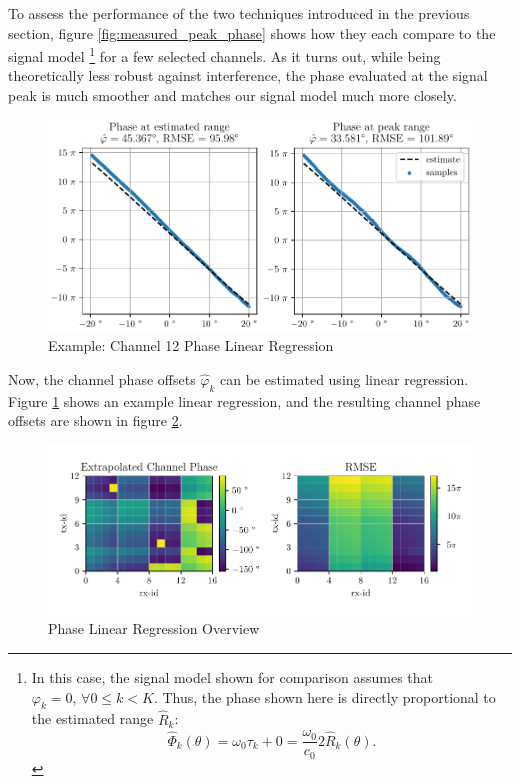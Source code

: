 To assess the performance of the two techniques introduced in the previous section,
figure \ref{fig:measured_peak_phase} shows how they each compare to the signal model
\footnote{
    In this case, the signal model shown for comparison assumes that $\varphi_k = 0,\, \forall 0 \leq k<K$.
    Thus, the phase shown here is directly proportional to the estimated range $\hat R_k$:
    $$
        \hat\Phi_k(\theta) = \omega_0 \tau_k + 0 =  \frac{\omega_0}{c_0}2\hat R_k(\theta).
    $$
} for a few selected channels.
As it turns out, while being theoretically less robust against interference,
the phase evaluated at the signal peak is much smoother and matches our signal model much more closely. \\
\begin{figure}
    \centering
    \includegraphics[width=\textwidth]{../figures/ch12_phase_linreg.pdf}
    \caption{Example: Channel 12 Phase Linear Regression}
    \label{fig:ch12_phase_linreg}
\end{figure}
Now, the channel phase offsets $\hat \varphi_k$ can be estimated using linear regression.
Figure \ref{fig:ch12_phase_linreg} shows an example linear regression,
and the resulting channel phase offsets are shown in figure \ref{fig:phase_linreg}.
\begin{figure}
    \centering
    \includegraphics[width=\textwidth]{../figures/phase_linreg.pdf}
    \caption{Phase Linear Regression Overview}
    \label{fig:phase_linreg}
\end{figure}

